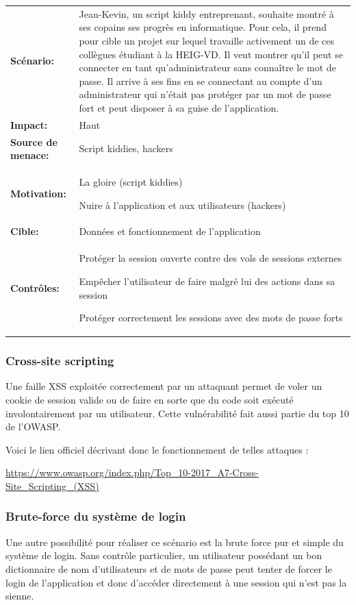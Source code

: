 \documentclass[12pt]{article}
\begin{document}
\renewcommand{\arraystretch}{1.6}
\begin{tabular}{@{}p{4cm}p{12cm}}
\textbf{Scénario:} &  Jean-Kevin, un script kiddy entreprenant, souhaite montré à ses copains ses progrès en informatique. Pour cela, il prend pour cible un projet sur lequel travaille activement un de ces collègues étudiant à la HEIG-VD. Il veut montrer qu'il peut se connecter en tant qu'administrateur sans connaître le
mot de passe. Il arrive à ses fins en se connectant au compte d'un
administrateur qui n'était pas protéger par un mot de passe fort et
peut disposer à sa guise de l'application.\\
\textbf{Impact:} & Haut \\
\textbf{Source de menace: } & Script kiddies, hackers \\
\textbf{Motivation:} & La gloire (script kiddies)

Nuire à l'application et aux utilisateurs (hackers)\\
\textbf{Cible:} & Données et fonctionnement de l'application \\
\textbf{Contrôles:} & Protéger la session ouverte contre des vols de sessions externes

Empêcher l'utilisateur de faire malgré lui des actions dans sa session

Protéger correctement les sessions avec des mots de passe forts
\end{tabular}
\renewcommand{\arraystretch}{1}

\subsubsection{Cross-site scripting}

Une faille XSS exploitée correctement par un attaquant permet de voler un cookie de session valide ou de faire en sorte que du code soit exécuté involontairement par un utilisateur. Cette vulnérabilité fait aussi partie du top 10 de l'OWASP.

Voici le lien officiel décrivant donc le fonctionnement de telles attaques :

\url{https://www.owasp.org/index.php/Top_10-2017_A7-Cross-Site_Scripting_(XSS)}

\subsubsection{Brute-force du système de login}

Une autre possibilité pour réaliser ce scénario est la brute force pur et simple du système de login. Sans contrôle particulier, un utilisateur possédant un bon dictionnaire de nom d'utilisateurs et de mots de
passe peut tenter de forcer le login de l'application et donc d'accéder directement à une session qui n'est pas la sienne.
\end{document}
